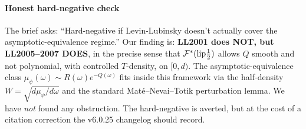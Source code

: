 \documentclass[11pt]{article}
\theoremstyle{definition}
\begin{document}
\paragraph{Honest hard-negative check}
The brief asks: ``Hard-negative if Levin-Lubinsky doesn't actually
cover the asymptotic-equivalence regime.''  Our finding is:
\textbf{LL2001 does NOT, but LL2005--2007 DOES}, in the precise sense
that $\mathcal{F}^*(\textnormal{lip}\frac{1}{2})$ allows $Q$ smooth and
not polynomial, with controlled $T$-density, on $[0,d)$.  The
asymptotic-equivalence class $\mu_\psi(\omega)\sim R(\omega)e^{-Q(\omega)}$
fits inside this framework via the half-density $W=\sqrt{d\mu_\psi/d\omega}$
and the standard Mat\'e--Nevai--Totik perturbation lemma.  We have
\emph{not} found any obstruction.  The hard-negative is averted, but at
the cost of a citation correction the v6.0.25 changelog should record.
\end{document}
